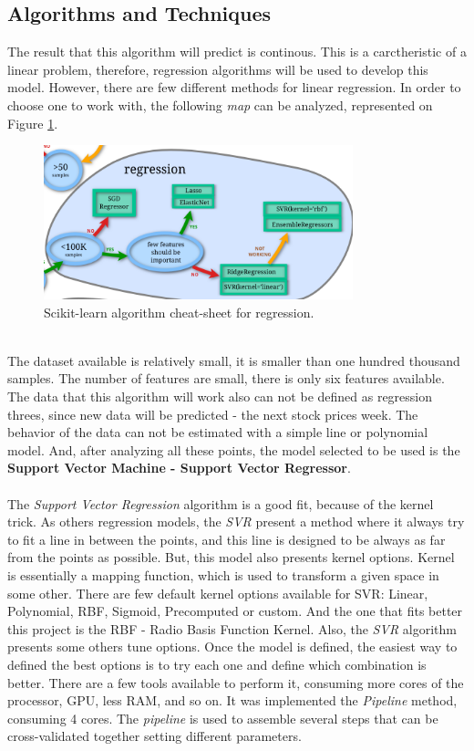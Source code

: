 \subsection{Algorithms and Techniques}
\label{subsec:algorithm}
The result that this algorithm will predict is continous. This is a carctheristic of a linear problem, therefore, regression algorithms will be used to develop this model.
However, there are few different methods for linear regression. In order to choose one to work with, the following \textit{map} can be analyzed, represented on Figure \ref{fig:regression_map}.\\
\begin{figure}[H]
\centering
\includegraphics[width=0.8\textwidth]{figures/regression_map.png}
\caption{\label{fig:data} Scikit-learn algorithm cheat-sheet for regression.}
\label{fig:regression_map}
\end{figure}
\ \\
The dataset available is relatively small, it is smaller than one hundred thousand samples. The number of features are small, there is only six features available. The data that this 
algorithm will work also can not be defined as regression threes, since new data will be predicted - the next stock prices week.
The behavior of the data can not be estimated with a simple line or polynomial model. And, after analyzing all these points, the model selected to be used is the \textbf{Support Vector Machine - 
Support Vector Regressor}.\\
\\
The \textit{Support Vector Regression} algorithm is a good fit, because of the kernel trick. As others regression models, the \textit{SVR} present a method where it always try to fit a line
in between the points, and this line is designed to be always as far from the points as possible. But, this model also presents kernel options. Kernel is essentially a mapping function, which is
used to transform a given space in some other. There are few default kernel options available for SVR: Linear, Polynomial, RBF, Sigmoid, Precomputed or custom. And the one that fits better
this project is the RBF - Radio Basis Function Kernel. Also, the \textit{SVR} algorithm presents some others tune options. Once the model is defined, the easiest way to defined the best options
is to try each one and define which combination is better. There are a few tools available to perform it, consuming more cores of the processor, GPU, less RAM, and so on. It was implemented
the \textit{Pipeline} method, consuming 4 cores. The \textit{pipeline} is used to assemble several steps that can be cross-validated together setting different parameters.



